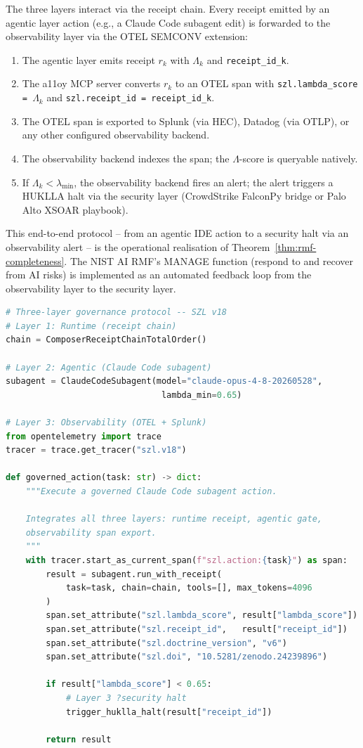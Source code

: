 The three layers interact via the receipt chain.  Every receipt emitted
by an agentic layer action (e.g., a Claude Code subagent edit) is forwarded
to the observability layer via the OTEL SEMCONV extension:

\begin{enumerate}
  \item The agentic layer emits receipt $r_k$ with $\Lambda_k$ and
    \texttt{receipt\_id\_k}.
  \item The a11oy MCP server converts $r_k$ to an OTEL span with
    \texttt{szl.lambda\_score = $\Lambda_k$} and
    \texttt{szl.receipt\_id = receipt\_id\_k}.
  \item The OTEL span is exported to Splunk (via HEC), Datadog (via OTLP),
    or any other configured observability backend.
  \item The observability backend indexes the span; the $\Lambda$-score
    is queryable natively.
  \item If $\Lambda_k < \lambda_{\min}$, the observability backend fires
    an alert; the alert triggers a HUKLLA halt via the security layer
    (CrowdStrike FalconPy bridge or Palo Alto XSOAR playbook).
\end{enumerate}

This end-to-end protocol -- from an agentic IDE action to a security halt
via an observability alert -- is the operational realisation of
Theorem~\ref{thm:rmf-completeness}.  The NIST AI RMF's MANAGE function
(respond to and recover from AI risks) is implemented as an automated
feedback loop from the observability layer to the security layer.

\begin{lstlisting}[language=Python, caption={End-to-end three-layer
  protocol sketch}, label={lst:three-layer-protocol}]
# Three-layer governance protocol -- SZL v18
# Layer 1: Runtime (receipt chain)
chain = ComposerReceiptChainTotalOrder()

# Layer 2: Agentic (Claude Code subagent)
subagent = ClaudeCodeSubagent(model="claude-opus-4-8-20260528",
                               lambda_min=0.65)

# Layer 3: Observability (OTEL + Splunk)
from opentelemetry import trace
tracer = trace.get_tracer("szl.v18")

def governed_action(task: str) -> dict:
    """Execute a governed Claude Code subagent action.
    
    Integrates all three layers: runtime receipt, agentic gate,
    observability span export.
    """
    with tracer.start_as_current_span(f"szl.action:{task}") as span:
        result = subagent.run_with_receipt(
            task=task, chain=chain, tools=[], max_tokens=4096
        )
        span.set_attribute("szl.lambda_score", result["lambda_score"])
        span.set_attribute("szl.receipt_id",   result["receipt_id"])
        span.set_attribute("szl.doctrine_version", "v6")
        span.set_attribute("szl.doi", "10.5281/zenodo.24239896")
        
        if result["lambda_score"] < 0.65:
            # Layer 3 ?security halt
            trigger_huklla_halt(result["receipt_id"])
        
        return result
\end{lstlisting}

